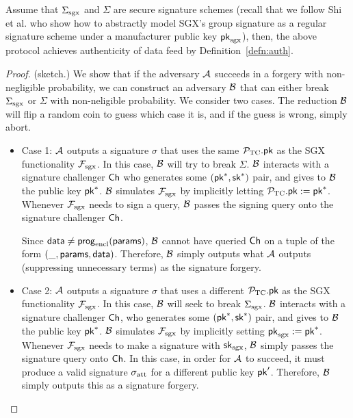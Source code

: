 \begin{theorem}[Authenticity]
Assume that ${\Sigma_{\textrm{sgx}}}$
and $\Sigma$ are secure signature schemes (recall
that we follow Shi et al.  who show
how to abstractly  
model SGX's group signature as a regular signature
scheme under a manufacturer public key ${\sf pk}_{\mathrm{sgx}}$),
then, the above 
protocol achieves authenticity of data feed by Definition~\ref{defn:auth}.
\end{theorem}
\begin{proof} (sketch.)
We show that if the 
adversary $\mathcal{A}$ succeeds in a forgery with non-negligible probability,
we can construct an adversary $\mathcal{B}$ that can either
break ${\Sigma_{\textrm{sgx}}}$ or $\Sigma$ with non-neligible probability.
We consider two cases. 
The reduction $\mathcal{B}$ will flip a random coin to guess which
case it is, and if the guess is wrong, simply abort.
\begin{itemize}[leftmargin=5mm]
\item
Case 1: $\mathcal{A}$ outputs a signature $\sigma$ that uses the same  
${\mathcal{P}}_{\text{TC}}.{\sf pk}$ as the SGX functionality $\mathcal{F}_{\textrm{sgx}}$.
In this case, $\mathcal{B}$ will try to break $\Sigma$. 
$\mathcal{B}$ interacts with a signature challenger ${\sf Ch}$ who generates
some $({\sf pk}^*, {\sf sk}^*)$ pair, and gives to $\mathcal{B}$ the public key
${\sf pk}^*$. $\mathcal{B}$ simulates 
$\mathcal{F}_{\textrm{sgx}}$ by implicitly letting ${\mathcal{P}}_{\text{TC}}.{\sf pk} := {\sf pk}^*$.
Whenever $\mathcal{F}_{\textrm{sgx}}$ needs to sign a query, $\mathcal{B}$ passes the signing query
onto the signature challenger ${\sf Ch}$.

Since ${\sf data} \neq {\sf prog}_{\textrm{encl}}({\sf params})$,
$\mathcal{B}$ cannot have queried ${\sf Ch}$  
on a tuple of the form $(\_, {\sf params}, {\sf data})$. 
Therefore, $\mathcal{B}$ simply outputs 
what $\mathcal{A}$ 
outputs (suppressing unnecessary terms) as the signature forgery. 

\item
Case 2:
 $\mathcal{A}$ outputs a signature $\sigma$ that uses a different 
${\mathcal{P}}_{\text{TC}}.{\sf pk}$ as the SGX functionality $\mathcal{F}_{\textrm{sgx}}$.
In this case, $\mathcal{B}$ will seek to break ${\Sigma_{\textrm{sgx}}}$.
$\mathcal{B}$ interacts with a signature challenger ${\sf Ch}$, who generates
some $({\sf pk}^*, {\sf sk}^*)$ pair, and gives to $\mathcal{B}$ the public key
${\sf pk}^*$. $\mathcal{B}$ simulates $\mathcal{F}_{\textrm{sgx}}$ by implicitly setting
${\sf pk}_{\mathrm{sgx}} := {\sf pk}^*$.
Whenever $\mathcal{F}_{\textrm{sgx}}$ needs to make a signature
with ${\sf sk}_{\mathrm{sgx}}$, 
$\mathcal{B}$ simply passes the signature query onto ${\sf Ch}$.
In this case, in order for $\mathcal{A}$ to succeed,
it must produce a valid signature ${\sigma_{\textrm{att}}}$ 
for a different public key ${\sf pk}'$.
Therefore, $\mathcal{B}$ simply outputs this as a signature forgery.
\end{itemize}
\end{proof}




